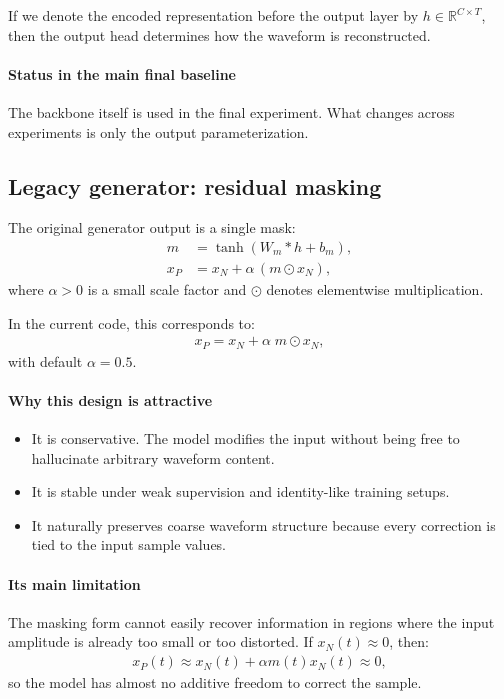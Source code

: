 \documentclass[11pt]{article}
\begin{document}
If we denote the encoded representation before the output layer by $h \in \mathbb{R}^{C \times T}$, then the output head determines how the waveform is reconstructed.

\paragraph{Status in the main final baseline}
The backbone itself is used in the final experiment. What changes across experiments is only the output parameterization.

\subsection{Legacy generator: residual masking}
The original generator output is a single mask:
\begin{align}
    m &= \tanh(W_m * h + b_m), \\
    x_P &= x_N + \alpha \,(m \odot x_N),
\end{align}
where $\alpha > 0$ is a small scale factor and $\odot$ denotes elementwise multiplication.

In the current code, this corresponds to:
\begin{align}
    x_P = x_N + \alpha \; m \odot x_N,
\end{align}
with default $\alpha = 0.5$.

\paragraph{Why this design is attractive}
\begin{itemize}[leftmargin=*]
    \item It is conservative. The model modifies the input without being free to hallucinate arbitrary waveform content.
    \item It is stable under weak supervision and identity-like training setups.
    \item It naturally preserves coarse waveform structure because every correction is tied to the input sample values.
\end{itemize}

\paragraph{Its main limitation}
The masking form cannot easily recover information in regions where the input amplitude is already too small or too distorted. If $x_N(t) \approx 0$, then:
\begin{align}
    x_P(t) \approx x_N(t) + \alpha m(t) x_N(t) \approx 0,
\end{align}
so the model has almost no additive freedom to correct the sample.
\end{document}

